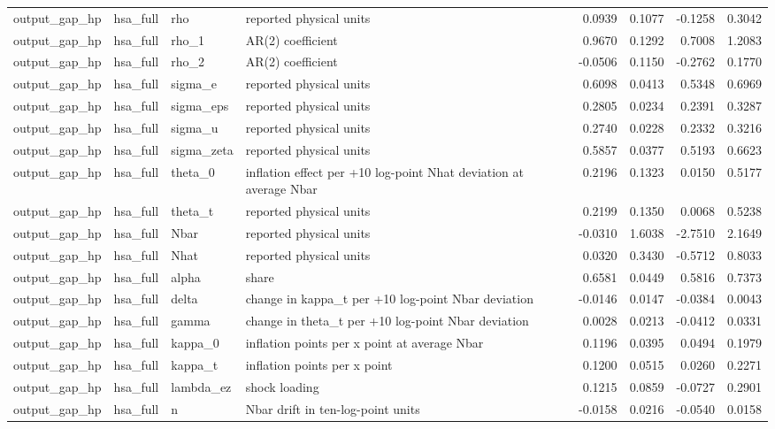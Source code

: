 \begin{tabular}{llllrrrr}
output\_gap\_hp & hsa\_full & rho & reported physical units & 0.0939 & 0.1077 & -0.1258 & 0.3042 \\
output\_gap\_hp & hsa\_full & rho\_1 & AR(2) coefficient & 0.9670 & 0.1292 & 0.7008 & 1.2083 \\
output\_gap\_hp & hsa\_full & rho\_2 & AR(2) coefficient & -0.0506 & 0.1150 & -0.2762 & 0.1770 \\
output\_gap\_hp & hsa\_full & sigma\_e & reported physical units & 0.6098 & 0.0413 & 0.5348 & 0.6969 \\
output\_gap\_hp & hsa\_full & sigma\_eps & reported physical units & 0.2805 & 0.0234 & 0.2391 & 0.3287 \\
output\_gap\_hp & hsa\_full & sigma\_u & reported physical units & 0.2740 & 0.0228 & 0.2332 & 0.3216 \\
output\_gap\_hp & hsa\_full & sigma\_zeta & reported physical units & 0.5857 & 0.0377 & 0.5193 & 0.6623 \\
output\_gap\_hp & hsa\_full & theta\_0 & inflation effect per +10 log-point Nhat deviation at average Nbar & 0.2196 & 0.1323 & 0.0150 & 0.5177 \\
output\_gap\_hp & hsa\_full & theta\_t & reported physical units & 0.2199 & 0.1350 & 0.0068 & 0.5238 \\
output\_gap\_hp & hsa\_full & Nbar & reported physical units & -0.0310 & 1.6038 & -2.7510 & 2.1649 \\
output\_gap\_hp & hsa\_full & Nhat & reported physical units & 0.0320 & 0.3430 & -0.5712 & 0.8033 \\
output\_gap\_hp & hsa\_full & alpha & share & 0.6581 & 0.0449 & 0.5816 & 0.7373 \\
output\_gap\_hp & hsa\_full & delta & change in kappa\_t per +10 log-point Nbar deviation & -0.0146 & 0.0147 & -0.0384 & 0.0043 \\
output\_gap\_hp & hsa\_full & gamma & change in theta\_t per +10 log-point Nbar deviation & 0.0028 & 0.0213 & -0.0412 & 0.0331 \\
output\_gap\_hp & hsa\_full & kappa\_0 & inflation points per x point at average Nbar & 0.1196 & 0.0395 & 0.0494 & 0.1979 \\
output\_gap\_hp & hsa\_full & kappa\_t & inflation points per x point & 0.1200 & 0.0515 & 0.0260 & 0.2271 \\
output\_gap\_hp & hsa\_full & lambda\_ez & shock loading & 0.1215 & 0.0859 & -0.0727 & 0.2901 \\
output\_gap\_hp & hsa\_full & n & Nbar drift in ten-log-point units & -0.0158 & 0.0216 & -0.0540 & 0.0158 \\

\end{tabular}
